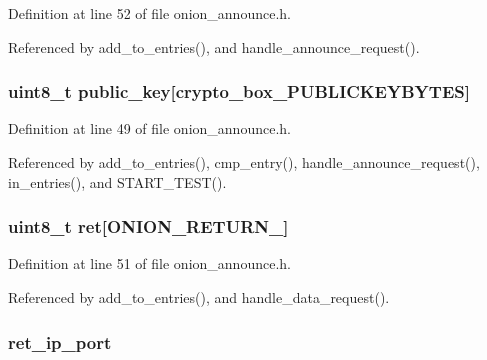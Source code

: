Definition at line 52 of file onion\+\_\+announce.\+h.



Referenced by add\+\_\+to\+\_\+entries(), and handle\+\_\+announce\+\_\+request().

\hypertarget{struct_onion___announce___entry_aaa806bb1136fb3d4b5d8d8970b596ff7}{
\subsubsection[{public\+\_\+key}]{\setlength{\rightskip}{0pt plus 5cm}uint8\+\_\+t public\+\_\+key\mbox{[}crypto\+\_\+box\+\_\+\+P\+U\+B\+L\+I\+C\+K\+E\+Y\+B\+Y\+T\+E\+S\mbox{]}}}\label{struct_onion___announce___entry_aaa806bb1136fb3d4b5d8d8970b596ff7}


Definition at line 49 of file onion\+\_\+announce.\+h.



Referenced by add\+\_\+to\+\_\+entries(), cmp\+\_\+entry(), handle\+\_\+announce\+\_\+request(), in\+\_\+entries(), and S\+T\+A\+R\+T\+\_\+\+T\+E\+S\+T().

\hypertarget{struct_onion___announce___entry_a860a2c4025701999e0d03f73b1863cdd}{
\subsubsection[{ret}]{\setlength{\rightskip}{0pt plus 5cm}uint8\+\_\+t ret\mbox{[}{\bf O\+N\+I\+O\+N\+\_\+\+R\+E\+T\+U\+R\+N\+\_}\mbox{]}}}\label{struct_onion___announce___entry_a860a2c4025701999e0d03f73b1863cdd}


Definition at line 51 of file onion\+\_\+announce.\+h.



Referenced by add\+\_\+to\+\_\+entries(), and handle\+\_\+data\+\_\+request().

\hypertarget{struct_onion___announce___entry_a28f2dcc657352ee4855d05ed42e4a4af}{
\subsubsection[{ret\+\_\+ip\+\_\+port}]{ ret\+\_\+ip\+\_\+port}}\label{struct_onion___announce___entry_a28f2dcc657352ee4855d05ed42e4a4af}


